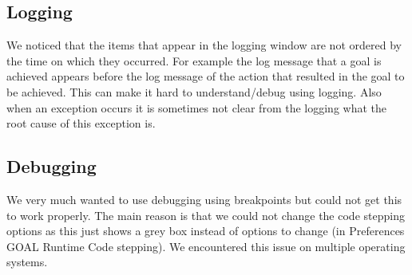 \documentclass[a4paper,11pt]{article}
\begin{document}
\subsection{Logging}
We noticed that the items that appear in the logging window are not ordered by the time on which they occurred. For example the log message that a goal is achieved appears before the log message of the action that resulted in the goal to be achieved. This can make it hard to understand/debug using logging. Also when an exception occurs it is sometimes not clear from the logging what the root cause of this exception is.

\subsection{Debugging}
We very much wanted to use debugging using breakpoints but could not get this to work properly. The main reason is that we could not change the code stepping options as this just shows a grey box instead of options to change (in Preferences \textrightarrow GOAL \textrightarrow Runtime \textrightarrow Code stepping). We encountered this issue on multiple operating systems. 
\end{document}
